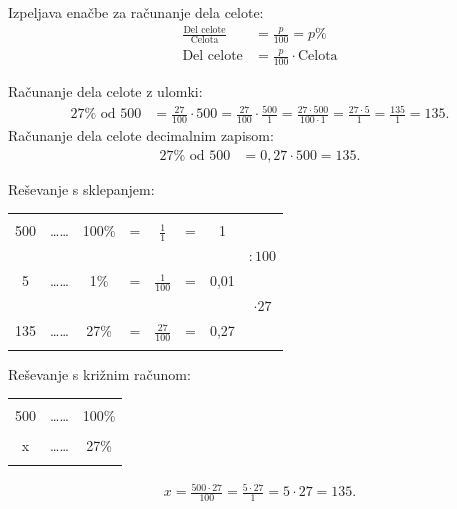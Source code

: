 \documentclass{article}
\begin{document}
Izpeljava enačbe za računanje dela celote:
\begin{align*}
    \frac{\text{Del celote}}{\text{Celota}} &= \frac{p}{100} = p\% \\
    \text{Del celote} &= \frac{p}{100} \cdot \text{Celota}
\end{align*}

Računanje dela celote z ulomki:
\begin{align*}
    27\% \text{ od } 500 &= \frac{27}{100} \cdot 500 = \frac{27}{100} \cdot \frac{500}{1} = \frac{27 \cdot 500}{100 \cdot 1} = \frac{27 \cdot 5}{1} = \frac{135}{1} = 135.
\end{align*}
Računanje dela celote decimalnim zapisom:
\begin{align*}
    27\% \text{ od } 500 &= 0,27 \cdot 500 = 135.
\end{align*}

Reševanje s sklepanjem:
\begin{center}
    \begin{tabular}{ c c c c c c c c }
        &&&&&&&  \\
        500 & \dots\dots & 100\% & = & $\frac{1}{1}$ & = & 1\\ 
        &&&&&&&  $:100$ \\
        5 & \dots\dots & 1\% & = & $\frac{1}{100}$ & = & 0,01\\ 
        &&&&&&&  $\cdot 27$\\
        135 & \dots\dots & 27\% & = & $\frac{27}{100}$ & = & 0,27\\ 
        &&&&&&&  \\
    \end{tabular}
\end{center}

Reševanje s križnim računom:
\begin{center}
    \begin{tabular}{ c c c  }
        && \\
        500 & \dots\dots & 100\% \\ 
        && \\
        x & \dots\dots & 27\% \\ 
        && \\
    \end{tabular}
\end{center}

\begin{align*}
    x = \frac{500 \cdot 27}{100} = \frac{5 \cdot 27}{1} = 5 \cdot 27 = 135.
\end{align*}
\end{document}
